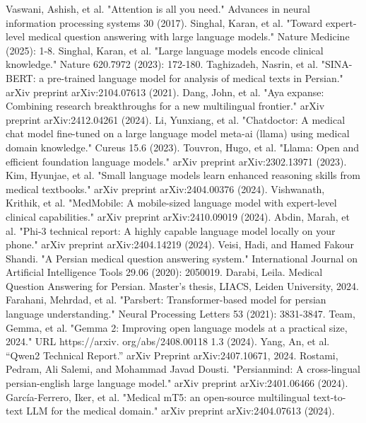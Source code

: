\documentclass[conference]{IEEEtran}
\begin{document}
\begin{thebibliography}{00}
Vaswani, Ashish, et al. "Attention is all you need." Advances in neural information processing systems 30 (2017).
Singhal, Karan, et al. "Toward expert-level medical question answering with large language models." Nature Medicine (2025): 1-8.
Singhal, Karan, et al. "Large language models encode clinical knowledge." Nature 620.7972 (2023): 172-180.
Taghizadeh, Nasrin, et al. "SINA-BERT: a pre-trained language model for analysis of medical texts in Persian." arXiv preprint arXiv:2104.07613 (2021).
Dang, John, et al. "Aya expanse: Combining research breakthroughs for a new multilingual frontier." arXiv preprint arXiv:2412.04261 (2024).
Li, Yunxiang, et al. "Chatdoctor: A medical chat model fine-tuned on a large language model meta-ai (llama) using medical domain knowledge." Cureus 15.6 (2023).
Touvron, Hugo, et al. "Llama: Open and efficient foundation language models." arXiv preprint arXiv:2302.13971 (2023).
Kim, Hyunjae, et al. "Small language models learn enhanced reasoning skills from medical textbooks." arXiv preprint arXiv:2404.00376 (2024).
Vishwanath, Krithik, et al. "MedMobile: A mobile-sized language model with expert-level clinical capabilities." arXiv preprint arXiv:2410.09019 (2024).
Abdin, Marah, et al. "Phi-3 technical report: A highly capable language model locally on your phone." 
arXiv preprint arXiv:2404.14219 (2024).
Veisi, Hadi, and Hamed Fakour Shandi. "A Persian medical question answering system." International Journal on Artificial Intelligence Tools 29.06 (2020): 2050019. 
Darabi, Leila. Medical Question Answering for Persian. Master’s thesis, LIACS, Leiden University, 2024.
Farahani, Mehrdad, et al. "Parsbert: Transformer-based model for persian language understanding." Neural Processing Letters 53 (2021): 3831-3847.
Team, Gemma, et al. "Gemma 2: Improving open language models at a practical size, 2024." URL https://arxiv. org/abs/2408.00118 1.3 (2024).
Yang, An, et al. “Qwen2 Technical Report.” arXiv Preprint arXiv:2407.10671, 2024.
Rostami, Pedram, Ali Salemi, and Mohammad Javad Dousti. "Persianmind: A cross-lingual persian-english large language model." arXiv preprint arXiv:2401.06466 (2024).
García-Ferrero, Iker, et al. "Medical mT5: an open-source multilingual text-to-text LLM for the medical domain." arXiv preprint arXiv:2404.07613 (2024).

\end{thebibliography}
\end{document}
